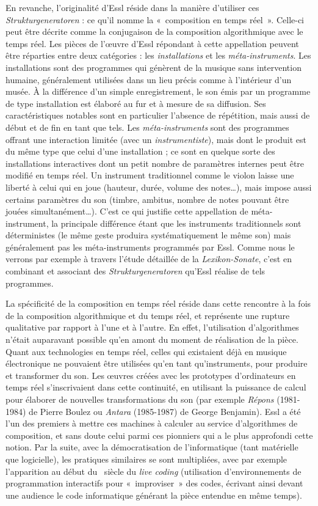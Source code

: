 \documentclass[a4paper,12pt]{article}
\newcommand{\guill}[1]{«~#1~»}
\begin{document}
En revanche, l'originalité d'Essl réside dans la manière d'utiliser ces \emph{Strukturgeneratoren} : ce qu'il nomme la \guill{composition en temps réel}. Celle-ci peut être décrite comme la conjugaison de la composition algorithmique avec le temps réel. Les pièces de l'œuvre d'Essl répondant à cette appellation peuvent être réparties entre deux catégories : les \emph{installations} et les \emph{méta-instruments}. Les installations sont des programmes qui génèrent de la musique sans intervention humaine, généralement utilisées dans un lieu précis comme à l'intérieur d'un musée. À la différence d'un simple enregistrement, le son émis par un programme de type installation est élaboré au fur et à mesure de sa diffusion. Ses caractéristiques notables sont en particulier l'absence de répétition, mais aussi de début et de fin en tant que tels. Les \emph{méta-instruments} sont des programmes offrant une interaction limitée (avec un \emph{instrumentiste}), mais dont le produit est du même type que celui d'une installation ; ce sont en quelque sorte des installations interactives dont un petit nombre de paramètres internes peut être modifié en temps réel. Un instrument traditionnel comme le violon laisse une liberté à celui qui en joue (hauteur, durée, volume des notes\dots), mais impose aussi certains paramètres du son (timbre, ambitus, nombre de notes pouvant être jouées simultanément\dots). C'est ce qui justifie cette appellation de méta-instrument, la principale différence étant que les instruments traditionnels sont déterministes (le même geste produira systématiquement le même son) mais généralement pas les méta-instruments programmés par Essl. Comme nous le verrons par exemple à travers l'étude détaillée de la \emph{Lexikon-Sonate}, c'est en combinant et associant des \emph{Strukturgeneratoren} qu'Essl réalise de tels programmes.

La spécificité de la composition en temps réel réside dans cette rencontre à la fois de la composition algorithmique et du temps réel, et représente une rupture qualitative par rapport à l'une et à l'autre. En effet, l'utilisation d'algorithmes n'était auparavant possible qu'en amont du moment de réalisation de la pièce. Quant aux technologies en temps réel, celles qui existaient déjà en musique électronique ne pouvaient être utilisées qu'en tant qu'instruments, pour produire et transformer du son. Les œuvres créées avec les prototypes d'ordinateurs en temps réel s'inscrivaient dans cette continuité, en utilisant la puissance de calcul pour élaborer de nouvelles transformations du son (par exemple \emph{Répons} (1981-1984) de Pierre Boulez ou \emph{Antara} (1985-1987) de George Benjamin). Essl a été l'un des premiers à mettre ces machines à calculer au service d'algorithmes de composition, et sans doute celui parmi ces pionniers qui a le plus approfondi cette notion. Par la suite, avec la démocratisation de l'informatique (tant matérielle que logicielle), les pratiques similaires se sont multipliées, avec par exemple l'apparition au début du \XXIe~siècle du \emph{live coding} (utilisation d'environnements de programmation interactifs pour \guill{improviser} des codes, écrivant ainsi devant une audience le code informatique générant la pièce entendue en même temps).
\end{document}
